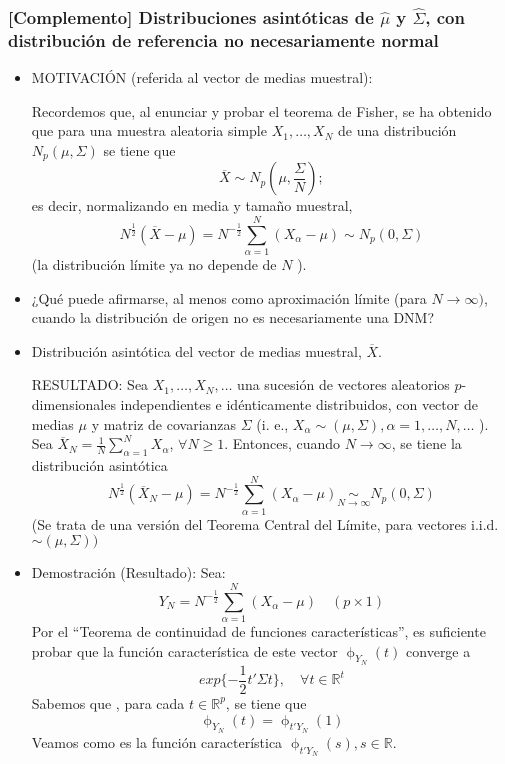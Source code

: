 \documentclass[11pt,a4paper]{article}
\begin{document}
\subsubsection{[Complemento] Distribuciones asintóticas de \texorpdfstring{$\hat{\mu}$}) y \texorpdfstring{$\hat{\Sigma}$}), con distribución de referencia no necesariamente normal}
\begin{itemize}
\item MOTIVACIÓN (referida al vector de medias muestral):

Recordemos que, al enunciar y probar el teorema de Fisher, se ha obtenido que para una muestra aleatoria simple $X_{1}, \ldots, X_{N}$ de una distribución $N_{p}(\mu, \Sigma)$ se tiene que
$$\overline{X} \sim N_{p}(\mu, \frac{\Sigma}{N});$$
es decir, normalizando en media y tamaño muestral,
$$N^{\frac{1}{2}}(\overline{X}-\mu)=N^{-\frac{1}{2}} \sum_{\alpha=1}^{N}(X_{\alpha}-\mu) \sim N_{p}(0, \Sigma)$$
(la distribución límite ya no depende de $N$ ).

\item ¿Qué puede afirmarse, al menos como aproximación límite (para $N \rightarrow \infty)$, cuando la distribución de origen no es necesariamente una DNM?

\item Distribución asintótica del vector de medias muestral, $\overline{X}$.

RESULTADO: Sea $X_{1}, \ldots, X_{N}, \ldots$ una sucesión de vectores aleatorios $p$-dimensionales independientes e idénticamente distribuidos, con vector de medias $\mu$ y matriz de covarianzas $\Sigma$ (i. e., $X_{\alpha} \sim(\mu, \Sigma), \alpha=1, \ldots, N, \ldots$ ). Sea $\overline{X}_{N}=\frac{1}{N} \sum_{\alpha=1}^{N} X_{\alpha}$, $\forall N \geq 1$. Entonces, cuando $N \to \infty$, se tiene la distribución asintótica
$$N^{\frac{1}{2}}(\overline{X}_{N}-\mu)=N^{-\frac{1}{2}} \sum_{\alpha=1}^{N}(X_{\alpha}-\mu) \underset{N \to \infty}{\sim} N_{p}(0, \Sigma)$$
(Se trata de una versión del Teorema Central del Límite, para vectores i.i.d. $\sim(\mu, \Sigma))$

\item Demostración (Resultado): Sea:
$$Y_{N} = N^{-\frac{1}{2}} \sum_{\alpha=1}^{N}(X_{\alpha} - \mu) \quad (p \times 1)$$
Por el ``Teorema de continuidad de funciones características'', es suficiente probar que la función característica de este vector $\upphi_{Y_{N}}(t)$ converge a
$$exp\{-\frac{1}{2}t' \Sigma t\}, \quad \forall t \in \mathbb{R}^{t}$$
Sabemos que , para cada $t \in \mathbb{R}^{p}$, se tiene que
$$\upphi_{Y_{N}}(t) = \upphi_{t'Y_{N}}(1)$$
Veamos como es la función característica $\upphi_{t'Y_{N}}(s), s \in \mathbb{R}$.


\end{itemize}
\end{document}
